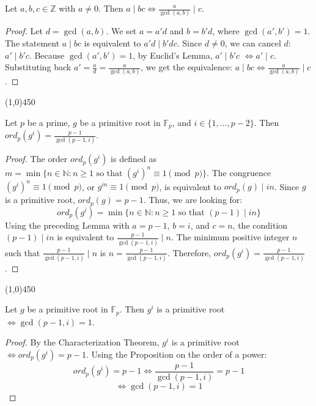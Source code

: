 \begin{lemma}
    Let $a, b, c \in \mathbb{Z}$ with $a \ne 0$. Then $a \mid bc \iff \frac{a}{\gcd(a, b)} \mid c$.
\end{lemma}
\begin{proof}
    Let $d = \gcd(a, b)$. We set $a = a'd$ and $b = b'd$, where $\gcd(a', b') = 1$.
    The statement $a \mid bc$ is equivalent to $a'd \mid b'dc$.
    Since $d \ne 0$, we can cancel $d$: $a' \mid b'c$.
    Because $\gcd(a', b') = 1$, by Euclid's Lemma, $a' \mid b'c$ $\iff a' \mid c$.
    Substituting back $a' = \frac{a}{d} = \frac{a}{\gcd(a, b)}$, we get the equivalence: $a \mid bc \iff \frac{a}{\gcd(a, b)} \mid c$.
\end{proof}

\begin{center}
    \vspace{10pt}
    \line(1,0){450}
    \vspace{25pt}
\end{center}

\begin{proposition}
    Let $p$ be a prime, $g$ be a primitive root in $\mathbb{F}_{p}$, and $i \in \{1, \dots, p-2\}$.
    Then $ord_{p}(g^{i}) = \frac{p-1}{\gcd(p-1, i)}$.
\end{proposition}
\begin{proof}
    The order $ord_{p}(g^{i})$ is defined as $m = \min\{n \in \mathbb{N} : n \geq 1 \text{ so that } (g^{i})^{n} \equiv 1 \pmod{p}\}$.
    The congruence $(g^{i})^{n} \equiv 1 \pmod{p}$, or $g^{in} \equiv 1 \pmod{p}$, is equivalent to $ord_{p}(g) \mid in$.
    Since $g$ is a primitive root, $ord_{p}(g) = p-1$. Thus, we are looking for:
    $$ ord_{p}(g^{i}) = \min\{n \in \mathbb{N} : n \geq 1 \text{ so that } (p-1) \mid in\} $$
    Using the preceding Lemma with $a = p-1$, $b = i$, and $c = n$, the condition $(p-1) \mid in$ is equivalent to $\frac{p-1}{\gcd(p-1, i)} \mid n$.
    The minimum positive integer $n$ such that $\frac{p-1}{\gcd(p-1, i)} \mid n$ is $n = \frac{p-1}{\gcd(p-1, i)}$.
    Therefore, $ord_{p}(g^{i}) = \frac{p-1}{\gcd(p-1, i)}$.
\end{proof}

\begin{center}
    \vspace{10pt}
    \line(1,0){450}
    \vspace{25pt}
\end{center}

\begin{corollary}
    Let $g$ be a primitive root in $\mathbb{F}_{p}$. Then $g^{i}$ is a primitive root $\iff \gcd(p-1, i) = 1$.
\end{corollary}
\begin{proof}
    By the Characterization Theorem, $g^{i}$ is a primitive root $\iff ord_{p}(g^{i}) = p-1$.
    Using the Proposition on the order of a power:
    $$ ord_{p}(g^{i}) = p-1 \iff \frac{p-1}{\gcd(p-1, i)} = p-1 $$
    $$ \iff \gcd(p-1, i) = 1 $$
\end{proof}

